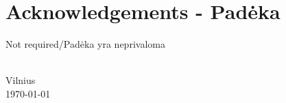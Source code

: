\chapter*{Acknowledgements - Padėka}
\label{cha:acknowledgements}


Not required/Padėka yra neprivaloma


{\flushright  
    \thesisAuthorName \ \thesisAuthorSurname \\ Vilnius\\ \today\\ 
}
